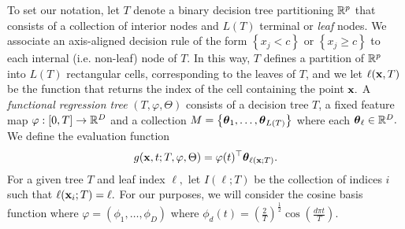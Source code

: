 \documentclass[12pt]{article}
\begin{document}
To set our notation, let $T$ denote a binary decision tree partitioning $\mathbb{R}^{p}$ that consists of a collection of interior nodes and $L(T)$ terminal or \textit{leaf} nodes. 
We associate an axis-aligned decision rule of the form $\left\{x_{j} < c \right\}$ or $\left\{x_{j} \geq c \right\}$ to each internal (i.e. non-leaf) node of $T.$
In this way, $T$ defines a partition of $\mathbb{R}^{p}$ into $L(T)$ rectangular cells, corresponding to the leaves of $T$,  and we let $\ell(\mathbf{x} ,T)$ be the function that returns the index of the cell containing the point $\mathbf{x}.$
A \textit{functional regression tree} $(T, \varphi, \Theta)$ consists of a decision tree $T$, a fixed feature map $\varphi: [0,T] \rightarrow \mathbb{R}^{D}$ and a collection $M = \left\{\boldsymbol{\theta}_{1}, \ldots, \boldsymbol{\theta}_{L(T)}\right\}$ where each $\boldsymbol{\theta}_{\ell} \in \mathbb{R}^{D}.$
We define the evaluation function 
$$
g(\mathbf{x}, t; T, \varphi, \Theta) = \varphi(t)^{\top}\boldsymbol{\theta}_{\ell(\mathbf{x};T)}.
$$
For a given tree $T$ and leaf index $\ell,$ let $I(\ell; T)$ be the collection of indices $i$ such that $\ell(\mathbf{x}_{i}; T) = \ell.$
For our purposes, we will consider the cosine basis function where $\varphi = (\phi_{1}, \ldots, \phi_{D})$ where $\phi_{d}(t) = \left(\frac{2}{T}\right)^{\frac{1}{2}}\cos\left(\frac{d \pi t}{T}\right).$
\end{document}
